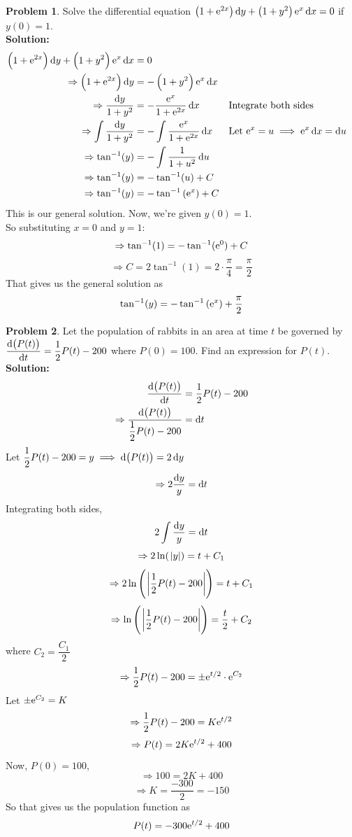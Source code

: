\documentclass[14]{article}
\theoremstyle{definition}
\newtheorem{prob}{Problem}
\theoremstyle{case}
\begin{document}
\begin{prob}
Solve the differential equation $\left(1 + {\rm e}^{2x}\right) \dif y + \left(1 + y^2\right){\rm e}^{x} \dif x = 0$ if $y(0) = 1$.\\
\textbf{Solution:}
\begin{align*}
\left(1 + {\rm e}^{2x}\right) \dif y + \left(1 + y^2\right){\rm e}^{x} \dif x &= 0\\
\Rightarrow \left(1 + {\rm e}^{2x}\right) \dif y &= - \left(1 + y^2\right){\rm e}^{x} \dif x\\
\Rightarrow \dfrac{\dif y}{1 + y^2} &= - \dfrac{{\rm e}^x }{1 + {\rm e}^{2x}}\dif x && \text{Integrate both sides}\\
\Rightarrow \int \dfrac{\dif y}{1 + y^2} &= - \int \dfrac{{\rm e}^x}{1+{\rm e}^{2x}}\dif x && \text{Let } {\rm e}^x = u \implies {\rm e}^x \dif x = \dif u\\
\Rightarrow \tan^{-1}(y) &= -\int\dfrac{1}{1 + u^2}\dif u\\
\Rightarrow \tan^{-1}(y) &= -\tan^{-1}(u) + C\\
\Rightarrow \tan^{-1}(y) &= -\tan^{-1}\left({\rm e}^{x}\right) + C
\end{align*}
This is our general solution. Now, we're given $y(0) = 1$.\\
So substituting $x = 0$ and $y = 1$:
\[\Rightarrow \tan^{-1}(1) = - \tan^{-1}({\rm e}^0) + C\]
\[\Rightarrow C = 2\tan^{-1}(1) = 2 \cdot \dfrac{\pi}{4} = \dfrac{\pi}2\]
That gives us the general solution as
\[\tan^{-1}(y) = -\tan^{-1}\left({\rm e}^{x}\right) + \dfrac{\pi}{2}\]
\end{prob}
\pagebreak
\begin{prob}
Let the population of rabbits in an area at time $t$ be governed by $\dfrac{\dif \left(P(t)\right)}{\dif t} = \dfrac12 P(t) - 200$ where $P(0) = 100$. Find an expression for $P(t)$.\\
\textbf{Solution:}
\begin{align*}
\dfrac{\dif \left(P(t)\right)}{\dif t} &= \dfrac12 P(t) - 200\\
\Rightarrow  \dfrac{\dif \left(P(t)\right)}{\dfrac12 P(t) - 200} &= \dif t
\end{align*}
Let $\dfrac12 P(t) - 200 = y \implies \dif\left(P(t)\right) = 2 \dif y$
\[\Rightarrow 2 \dfrac{\dif y}{y} = \dif t\]
Integrating both sides,
\[2 \int \dfrac{\dif y}{y} = \dif t\]
\[\Rightarrow 2 \ln(\;\abs{y}) = t + C_1\]
\[\Rightarrow 2\ln\left(\;\abs{\dfrac12 P(t) - 200}\right) = t + C_1\]
\[\Rightarrow \ln\left(\;\abs{\dfrac12 P(t) - 200}\right) = \dfrac{t}2 + C_2\]
where $C_2 = \dfrac{C_1}2$
\[\Rightarrow \dfrac12 P(t) - 200 = \pm{\rm e}^{t/2} \cdot {\rm e}^{C_2}\]
Let $\pm {\rm e}^{C_2} = K$
\[\Rightarrow \dfrac12 P(t) - 200 = K {\rm e}^{t/2}\]
\[\Rightarrow P(t) = {2K {\rm e}^{t/2} + 400}\]
Now, $P(0) = 100$,
\[\Rightarrow 100 = 2K + 400\]
\[\Rightarrow K = \dfrac{-300}{2} = -150\]
So that gives us the population function as
\[P(t) = -300{\rm e}^{t/2} + 400\]
\end{prob}
\end{document}

